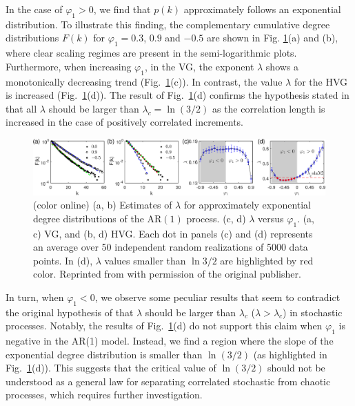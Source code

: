 		In the case of $\varphi_1 > 0$, we find that $p(k)$ approximately follows an exponential distribution. To illustrate this finding, the complementary cumulative degree distributions $F(k)$ for $\varphi_1 = 0.3 $, $0.9$ and $-0.5$ are shown in Fig. \ref{fig:lambda_AR1}(a) and (b), where clear scaling regimes are present in the semi-logarithmic plots. Furthermore, when increasing $\varphi_1$, in the VG, the exponent $\lambda$ shows a monotonically decreasing trend (Fig.~\ref{fig:lambda_AR1}(c)). In contrast, the value $\lambda$ for the HVG is increased (Fig.~\ref{fig:lambda_AR1}(d)). The result of Fig.~\ref{fig:lambda_AR1}(d) confirms the hypothesis stated in \cite{Lacasa2010} that all $\lambda$ should be larger than $\lambda_c = \ln (3/2)$ as the correlation length is increased in the case of positively correlated increments.
\begin{figure}
	\centering
	\includegraphics[width=\columnwidth]{Chapter04_VisibilityGt/ar1_positive_lambda_vg_hvg.eps}
\caption{(color online) (a, b) Estimates of $\lambda$ for approximately exponential degree distributions of the AR$(1)$ process. (c, d) $\lambda$ versus $\varphi_1$. (a, c) VG, and (b, d) HVG. Each dot in panels (c) and (d) represents an average over 50 independent random realizations of 5000 data points. In (d), $\lambda$ values smaller than $\ln 3/2$ are highlighted by red color. Reprinted from \cite{Zhang2017} with permission of the original publisher. \label{fig:lambda_AR1}}
\end{figure}

		In turn, when $\varphi_1 < 0$, we observe some peculiar results that seem to contradict the original hypothesis of \cite{Lacasa2010} that $\lambda$ should be larger than $\lambda_c$ ($\lambda > \lambda_c$) in stochastic processes. Notably, the results of Fig.~\ref{fig:lambda_AR1}(d) do not support this claim when $\varphi_1$ is negative in the AR(1) model. Instead, we find a region where the slope of the exponential degree distribution is smaller than $\ln (3/2)$ (as highlighted in Fig.~\ref{fig:lambda_AR1}(d)). This suggests that the critical value of $\ln (3/2)$ should not be understood as a general law for separating correlated stochastic from chaotic processes, which requires further investigation. 

